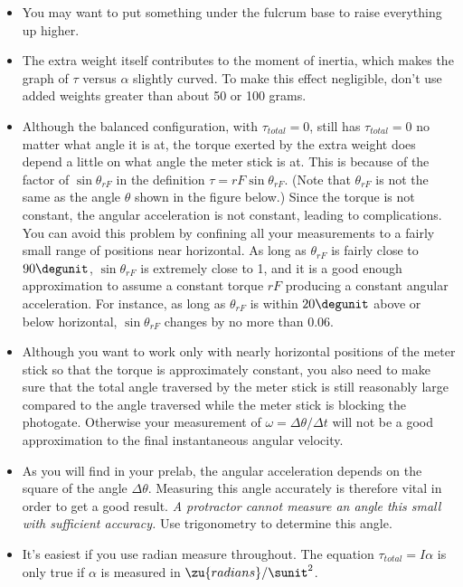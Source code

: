 \begin{itemize}
\item[] You may want to put something under the fulcrum base to
raise everything up higher.

\item[] The extra weight itself contributes to the moment of inertia,
which makes the graph of $\tau$ versus $\alpha$ slightly curved.
To make this effect negligible, don't use added weights greater than
about 50 or 100 grams.

\item[] Although the balanced configuration, with $\tau_{total}=0$,
still has $\tau_{total}=0$ no matter what angle it is at,
the torque exerted by the extra weight does depend a little
on what angle the meter stick is at.  This is because of the
factor of $\sin\theta_{rF} $ in the definition $\tau=rF\sin\theta_{rF} $. 
(Note that $\theta_{rF}$ is not the same as the angle $\theta$
shown in the figure below.)
Since the torque is not constant, the
angular acceleration is not constant, leading to complications.
 You can avoid this problem by confining all your measurements
to a fairly small range of positions near horizontal.  As
long as $\theta_{rF} $ is fairly close to $90\degunit$, $\sin\theta_{rF} $ 
is extremely close to 1, and it is a good enough
approximation to assume a constant torque $rF$
producing a constant angular acceleration. For instance, as
long as $\theta_{rF} $ is within $20\degunit$ above or below
horizontal, $\sin\theta_{rF} $ changes by no more than 0.06.

\item[] Although you want to work only with nearly horizontal
positions of the meter stick so that the torque is
approximately constant, you also need to make sure that the
total angle traversed by the meter stick is still reasonably
large compared to the angle traversed while the meter stick
is blocking the photogate.  Otherwise your measurement of
$\omega =\Delta \theta/\Delta t$ will not be a good approximation to
the final instantaneous angular velocity.

\item[] As you will find in your prelab, the angular acceleration
depends on the square of the angle $\Delta\theta$. Measuring this angle
accurately is therefore vital in order to get a good result.
\emph{A protractor cannot measure an angle this small with
sufficient accuracy.} Use trigonometry to determine this angle.

\item[] It's easiest if you use radian measure throughout.  The
equation $\tau_{total}=I\alpha $ is only true if $\alpha$ is
measured in $\zu{radians}/\sunit^2$.

\end{itemize}

